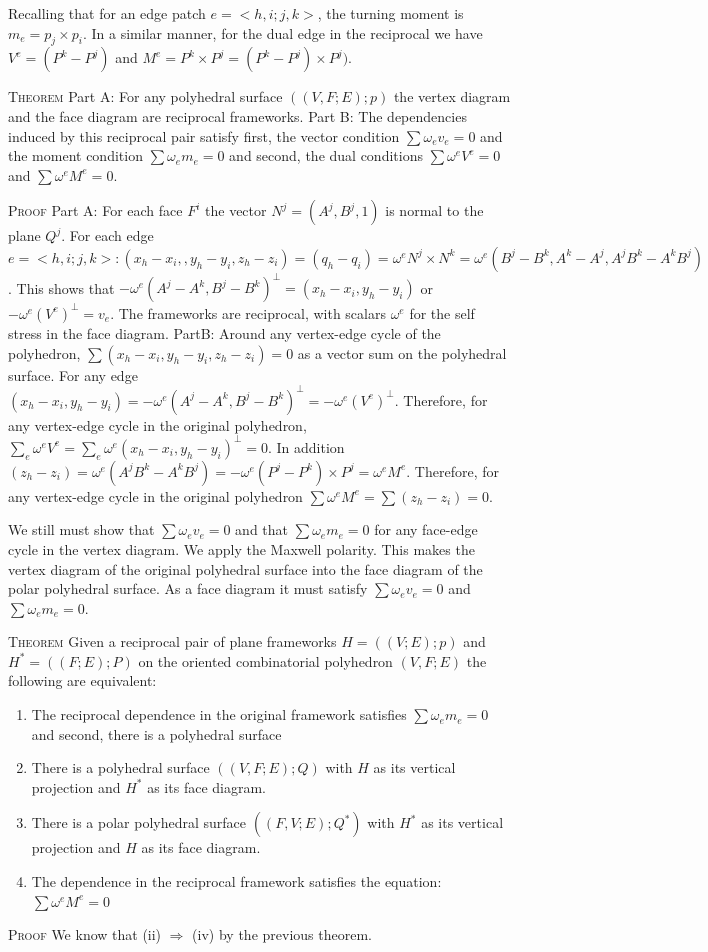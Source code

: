 \documentclass[english]{article}
\begin{document}
 Recalling that for an edge patch $e = <h,i;j,k>$, the turning moment is $m_e = p_j \times p_i$. In a similar manner, for the dual edge in the reciprocal we have $V^e = (P^k - P^j)$ and $M^e = P^k \times P^j = (P^k - P^j)\times P^j)$.
 
 \textsc{Theorem} Part A: For any polyhedral surface $((V,F;E);p)$ the vertex diagram and the face diagram are reciprocal frameworks.
 Part B: The dependencies induced by this reciprocal pair satisfy first, the vector condition $\sum \omega_e v_e = 0$ and the moment condition $\sum \omega_e m_e = 0$ and second, the dual conditions $\sum \omega^e V^e = 0$ and $\sum \omega^e M^e = 0$.
 
 \textsc{Proof} Part A: For each face $F^i$ the vector $N^j = (A^j, B^j,1)$ is normal to the plane $Q^j$. For each edge $e = <h,i;j,k>:  (x_h-x_i,,y_h-y_i, z_h-z_i)=(q_h-q_i) = \omega^e N^j \times N^k = \omega^e(B^j-B^k,A^k-A^j,A^jB^k-A^kB^j)$. This shows that $-\omega^e(A^j-A^k,B^j-B^k)^\bot = (x_h - x_i, y_h-y_i)$ or $-\omega^e(V^e)^\bot = v_e$. The frameworks are reciprocal, with scalars $\omega^e$ for the self stress in the face diagram.
 PartB: Around any vertex-edge cycle of the polyhedron, $\sum(x_h - x_i, y_h-y_i, z_h-z_i) = 0$ as a vector sum on the polyhedral surface. For any edge $(x_h-x_i,y_h-y_i) = -\omega^e(A^j-A^k,B^j-B^k)^\bot = -\omega^e(V^e)^\bot$. Therefore, for any vertex-edge cycle in the original polyhedron, $\sum_e \omega^eV^e = \sum_e \omega^e(x_h-x_i,y_h-y_i)^\bot = 0$. In addition $(z_h-z_i) = \omega^e(A^jB^k-A^kB^j) = -\omega^e(P^j-P^k) \times P^j = \omega^eM^e$. Therefore, for any vertex-edge cycle in the original polyhedron $\sum \omega^eM^e = \sum(z_h-z_i) = 0$. 
 
 We still must show that $\sum \omega_e v_e = 0$ and that $\sum \omega_em_e = 0$ for any face-edge cycle in the vertex diagram. We apply the Maxwell polarity. This makes the vertex diagram of the original polyhedral surface into the face diagram of the polar polyhedral surface. As a face diagram it must satisfy $\sum \omega_e v_e = 0$ and $\sum \omega_em_e = 0$.
 
 \textsc{Theorem} Given a reciprocal pair of plane frameworks $H=((V;E);p)$ and $H^* = ((F;E);P)$ on the oriented combinatorial polyhedron $(V,F;E)$ the following are equivalent: 
 \begin{enumerate} 
 	\item The reciprocal dependence in the original framework satisfies $\sum \omega_em_e = 0$ and second, there is a polyhedral surface 
 	\item There is a polyhedral surface $((V,F;E);Q)$ with $H$ as its vertical projection and $H^*$ as its face diagram.
	\item There is a polar polyhedral surface $((F,V;E);Q^*)$ with $H^*$ as its vertical projection and $H$ as its face diagram.
	\item The dependence in the reciprocal framework satisfies the equation: $\sum \omega^eM^e = 0$
\end{enumerate}
\textsc{Proof} We know that (ii) $\Rightarrow$ (iv) by the previous theorem. 
\end{document}
